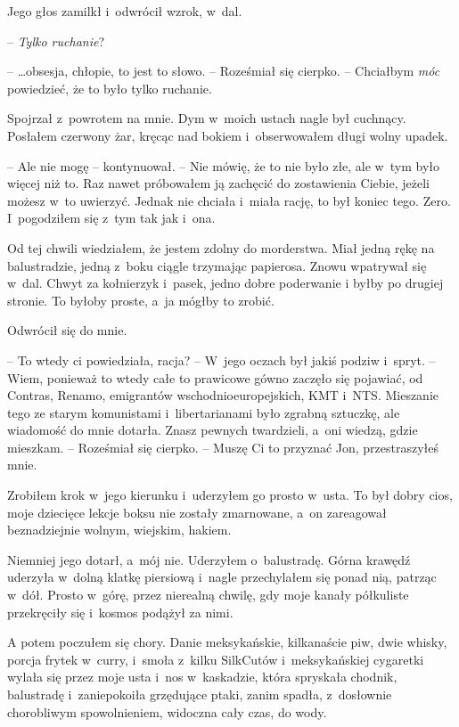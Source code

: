 \documentclass[oneside,polish,11pt,sfheadings]{mwbk}
\begin{document}
Jego głos zamilkł i~odwrócił wzrok, w~dal.

-- \emph{Tylko ruchanie}?

-- \ldots obsesja, chłopie, to jest to słowo. -- Roześmiał się cierpko. -- Chciałbym \emph{móc} powiedzieć, że to było tylko ruchanie.

Spojrzał z~powrotem na mnie. Dym w~moich ustach nagle był cuchnący.
Posłałem czerwony żar, kręcąc nad bokiem i~obserwowałem długi wolny
upadek.

-- Ale nie mogę -- kontynuował. -- Nie mówię, że to nie było złe, ale w~tym
było więcej niż to. Raz nawet próbowałem ją zachęcić do zostawienia
Ciebie, jeżeli możesz w~to uwierzyć. Jednak nie chciała i~miała rację,
to był koniec tego. Zero. I~pogodziłem się z~tym tak jak i~ona.

Od tej chwili wiedziałem, że jestem zdolny do morderstwa. Miał jedną
rękę na balustradzie, jedną z~boku ciągle trzymając papierosa. Znowu
wpatrywał się w~dal. Chwyt za kołnierzyk i~pasek, jedno dobre poderwanie
i byłby po drugiej stronie. To byłoby proste, a~ja mógłby to zrobić.

Odwrócił się do mnie. 

-- To wtedy ci powiedziała, racja? -- W~jego oczach
był jakiś podziw i~spryt. -- Wiem, ponieważ to wtedy całe to prawicowe
gówno zaczęło się pojawiać, od Contras, Renamo, emigrantów
wschodnioeuropejskich, KMT i~NTS. Mieszanie tego ze starym komunistami i~libertarianami było zgrabną sztuczkę, ale wiadomość do mnie dotarła.
Znasz pewnych twardzieli, a~oni wiedzą, gdzie mieszkam. -- Roześmiał się
cierpko. -- Muszę Ci to przyznać Jon, przestraszyłeś mnie.

Zrobiłem krok w~jego kierunku i~uderzyłem go prosto w~usta. To był dobry
cios, moje dziecięce lekcje boksu nie zostały zmarnowane, a~on
zareagował beznadziejnie wolnym, wiejskim, hakiem.

Niemniej jego dotarł, a~mój nie. Uderzyłem o~balustradę. Górna krawędź
uderzyła w~dolną klatkę piersiową i~nagle przechylałem się ponad nią,
patrząc w~dół. Prosto w~górę, przez nierealną chwilę, gdy moje kanały
półkuliste przekręciły się i~kosmos podążył za nimi.

A potem poczułem się chory. Danie meksykańskie, kilkanaście piw, dwie
whisky, porcja frytek w~curry, i~smoła z~kilku SilkCutów i~meksykańskiej
cygaretki wylała się przez moje usta i~nos w~kaskadzie, która spryskała
chodnik, balustradę i~zaniepokoiła grzędujące ptaki, zanim spadła, z~dosłownie chorobliwym spowolnieniem, widoczna cały czas, do wody.
\end{document}

